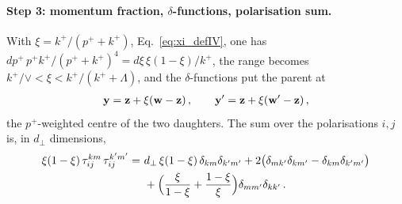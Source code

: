 \paragraph{Step 3: momentum fraction, $\delta$-functions, polarisation sum.} With $\xi=k^+/(p^++k^+)$, Eq.~\eqref{eq:xi_defIV}, one has $dp^+\,p^+k^+/(p^++k^+)^4=d\xi\,\xi(1-\xi)/k^+$, the range becomes $k^+/\vee<\xi<k^+/(k^++\Lambda)$, and the $\delta$-functions put the parent at
\begin{align}\label{eq:ex2_parent}
\mathbf{y}=\mathbf{z}+\xi(\mathbf{w}-\mathbf{z})\,,\qquad\mathbf{y}'=\mathbf{z}+\xi(\mathbf{w}'-\mathbf{z})\,,
\end{align}
the $p^+$-weighted centre of the two daughters. The sum over the polarisations $i,j$ is, in $d_\perp$ dimensions,
\begin{align}\label{eq:ex2_pol}
\xi(1-\xi)\,\tau^{km}_{ij}\,\tau^{k'm'}_{ij}=\ &d_\perp\,\xi(1-\xi)\,\delta_{km}\delta_{k'm'}+2\big(\delta_{mk'}\delta_{km'}-\delta_{km}\delta_{k'm'}\big)\notag\\&+\Big(\frac{\xi}{1-\xi}+\frac{1-\xi}{\xi}\Big)\delta_{mm'}\delta_{kk'}\,.
\end{align}

